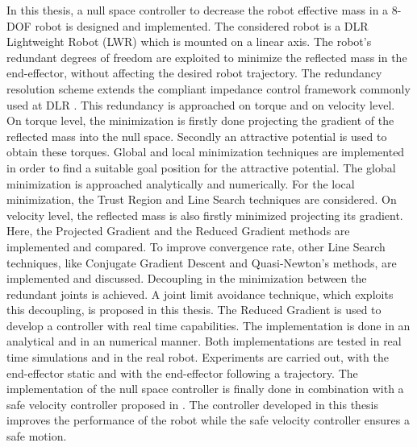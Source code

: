 In this thesis, a null space controller to decrease the robot effective mass in a 8-DOF robot is designed and implemented.
The considered robot is a DLR Lightweight Robot (LWR) which is mounted on a linear axis. The robot’s redundant degrees of freedom are exploited to minimize the reflected mass in the end-effector, without affecting the desired robot trajectory. The redundancy resolution scheme extends the compliant impedance control framework commonly used at DLR \cite{citeulike:11821616}. 
This redundancy is approached on torque and on velocity level. On torque level, the minimization is firstly done projecting the gradient of the reflected mass into the null space. Secondly an attractive potential is used to obtain these torques. Global and local minimization techniques are implemented in order to find a suitable goal position for the attractive potential. The global minimization is approached analytically and numerically. For the local minimization, the Trust Region and Line Search techniques are considered. 
On velocity level, the reflected mass is also firstly minimized projecting its gradient. Here, the Projected Gradient and the Reduced Gradient methods are implemented and compared. To improve convergence rate, other Line Search techniques, like Conjugate Gradient Descent and Quasi-Newton's methods, are implemented and discussed. Decoupling in the minimization between the redundant joints is achieved. A joint limit avoidance technique,  which exploits this decoupling, is proposed in this thesis. The Reduced Gradient is used to develop a controller with real time capabilities. The implementation is done in an analytical and in an numerical manner. Both implementations are tested in real time simulations and in the real robot. Experiments are carried out, with the end-effector static and with the end-effector following a trajectory.
The implementation of the null space controller is finally done in combination with a safe velocity controller proposed in \cite{sammi_paper}.  The controller developed in this thesis improves the performance of the robot while the safe velocity controller ensures a safe motion. 


